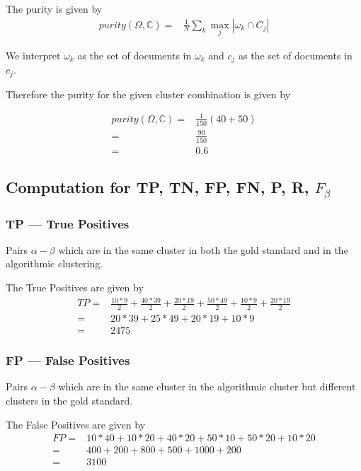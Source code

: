 \documentclass{article}
\begin{document}
The purity is given by 
\begin{align*}
  purity(\Omega, \mathbb{C}) = & \frac{1}{N} \sum_{k} \max_{j} |\omega_{k} \cap C_{j}|
\end{align*}

We interpret $\omega_{k}$ as the set of documents in $\omega_{k}$ and $ c_{j} $ as the set of documents in $c_{j}$.

Therefore the purity for the given cluster combination is given by 

\begin{align*}
  purity(\Omega, \mathbb{C}) =& \frac{1}{150} ( 40 + 50 )\\
  =& \frac{90}{150}\\
  =& 0.6
\end{align*}

\subsection{Computation for TP, TN, FP, FN, P, R, $F_{\beta}$ }
\subsubsection{TP --- True Positives}
Pairs $ \alpha -  \beta $ which are in the same cluster in both the gold standard and in the algorithmic clustering.

The True Positives are given by 
\begin{align*}
  TP =& \frac{10 * 9}{2} + \frac{40 * 39}{2} + \frac{20 * 19}{2} + \frac{50 * 49}{2} + \frac{10 * 9}{2} + \frac{20 * 19}{2} \\
  =& 20*39 + 25*49 + 20*19 + 10*9 \\
  =& 2475
\end{align*}

\subsubsection{FP --- False Positives}
Pairs $ \alpha -  \beta $ which are in the same cluster in the algorithmic cluster but different clusters in the gold standard.

The False Positives are given by 
\begin{align*}
  FP =& 10*40 + 10*20 + 40*20 + 50*10 + 50*20 + 10*20 \\
  =& 400 + 200 + 800 + 500 + 1000 + 200 \\
  =& 3100
\end{align*}
\end{document}
